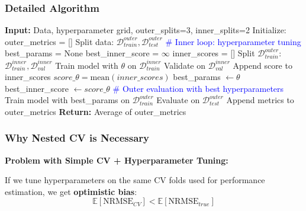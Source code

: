 \documentclass[12pt,a4paper]{article}
\begin{document}
\subsubsection{Detailed Algorithm}

\begin{algorithm}[H]
\caption{Nested Cross-Validation}
\begin{algorithmic}[1]
\State \textbf{Input:} Data, hyperparameter grid, outer\_splits=3, inner\_splits=2
\State Initialize: outer\_metrics = []
    \State Split data: $\mathcal{D}_{train}^{outer}, \mathcal{D}_{test}^{outer}$
    \State 
    \State \textcolor{blue}{\# Inner loop: hyperparameter tuning}
    \State best\_params = None
    \State best\_inner\_score = $\infty$
        \State inner\_scores = []
            \State Split $\mathcal{D}_{train}^{outer}$: $\mathcal{D}_{train}^{inner}, \mathcal{D}_{val}^{inner}$
            \State Train model with $\theta$ on $\mathcal{D}_{train}^{inner}$
            \State Validate on $\mathcal{D}_{val}^{inner}$
            \State Append score to inner\_scores
        \EndFor
        \State $score\_\theta = \text{mean}(inner\_scores)$
            \State best\_params $\gets \theta$
            \State best\_inner\_score $\gets score\_\theta$
        \EndIf
    \EndFor
    \State 
    \State \textcolor{blue}{\# Outer evaluation with best hyperparameters}
    \State Train model with best\_params on $\mathcal{D}_{train}^{outer}$
    \State Evaluate on $\mathcal{D}_{test}^{outer}$
    \State Append metrics to outer\_metrics
\EndFor
\State
\State \textbf{Return:} Average of outer\_metrics
\end{algorithmic}
\end{algorithm}

\subsubsection{Why Nested CV is Necessary}

\textbf{Problem with Simple CV + Hyperparameter Tuning:}

If we tune hyperparameters on the same CV folds used for performance estimation, we get \textbf{optimistic bias}:
\begin{equation}
\mathbb{E}[\text{NRMSE}_{CV}] < \mathbb{E}[\text{NRMSE}_{true}]
\end{equation}
\end{document}
